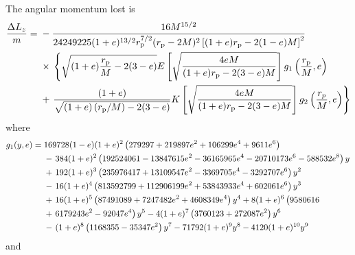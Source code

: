 The angular momentum lost is
\begin{align}
\frac{\Delta L_z}{m} = {} & - \frac{16 M^{{15}/{2}}}{24249225 (1 + e)^{{13}/{2}} r_\mathrm{p}^{{7}/{2}} (r_\mathrm{p} - 2 M)^2 \left[(1 + e) r_\mathrm{p} - 2 (1 - e) M\right]^{2}} \nonumber \\
 {} & \times {} \left\{\sqrt{(1 + e) \frac{r_\mathrm{p}}{M} - 2(3 - e)} E\left[\sqrt{\frac{4 e M}{(1+e) r_\mathrm{p} - 2(3 - e)M}}\right] g_1\left(\frac{r_\mathrm{p}}{M}, e\right) \right. \nonumber \\
 {} & + \left. \frac{(1 + e)}{\sqrt{(1 + e)\left(r_\mathrm{p}/M\right) - 2(3 - e)}} K\left[\sqrt{\frac{4 e M}{(1+e) r_\mathrm{p} - 2(3 - e)M}}\right] g_2\left(\frac{r_{p}}{M}, e\right)\right\}
\end{align}
where
\begin{align}
g_1(y, e) = {} & 169728 (1 - e) (1 + e)^2 \left(279297 + 219897 e^2 + 106299 e^4 + 9611 e^6 \right) \nonumber \\
 {} & - \left. 384 (1 + e)^2 \left(192524061 - 13847615 e^2 - 36165965 e^4 - 20710173 e^6 - 588532 e^8\right) y \right. \nonumber \\
 {} & + \left. 192 (1 + e)^3 \left(235976417 + 13109547 e^2 - 3369705 e^4 - 3292707e^6\right) y^2 \right. \nonumber \\
 {} & - \left. 16 (1 + e)^4 \left(813592799 + 112906199 e^2 + 53843933 e^4 + 602061 e^6\right) y^3 \right. \nonumber \\
 {} & + \left. 16 (1 + e)^5 \left(87491089 + 7247482 e^2 + 4608349 e^4\right) y^4 + 8 (1 + e)^6 \left(9580616 \vphantom{e^0} \right.\right. \nonumber \\
 {} & + \left. 6179243 e^2 - 92047 e^4\right) y^5 - 4 (1 + e)^7 \left(3760123 + 272087 e^2 \right) y^6 \nonumber \\
 {} & - \left. (1 + e)^8 \left(1168355 - 35347 e^2\right) y^7 - 71792 (1 + e)^9 y^8 - 4120 (1 + e)^{10} y^9 \right.
\end{align}
and
